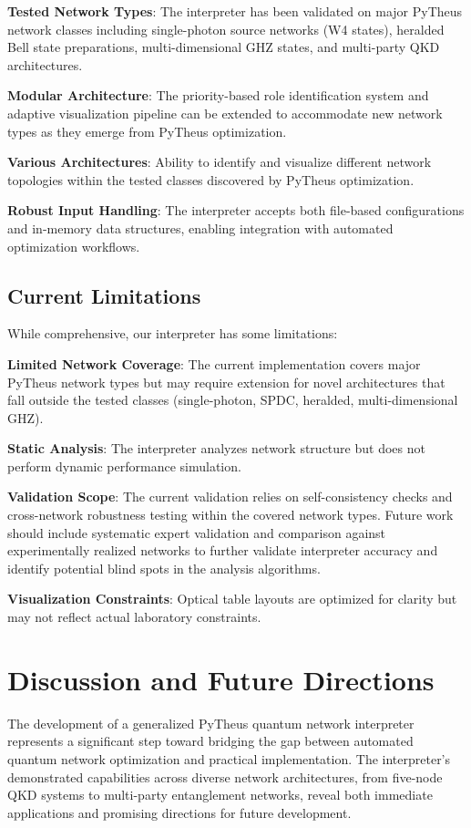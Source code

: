 \documentclass[11pt,a4paper]{article}
\begin{document}
\textbf{Tested Network Types}: The interpreter has been validated on major PyTheus network classes including single-photon source networks (W4 states), heralded Bell state preparations, multi-dimensional GHZ states, and multi-party QKD architectures.

\textbf{Modular Architecture}: The priority-based role identification system and adaptive visualization pipeline can be extended to accommodate new network types as they emerge from PyTheus optimization.

\textbf{Various Architectures}: Ability to identify and visualize different network topologies within the tested classes discovered by PyTheus optimization.

\textbf{Robust Input Handling}: The interpreter accepts both file-based configurations and in-memory data structures, enabling integration with automated optimization workflows.

\subsection{Current Limitations}

While comprehensive, our interpreter has some limitations:

\textbf{Limited Network Coverage}: The current implementation covers major PyTheus network types but may require extension for novel architectures that fall outside the tested classes (single-photon, SPDC, heralded, multi-dimensional GHZ).

\textbf{Static Analysis}: The interpreter analyzes network structure but does not perform dynamic performance simulation.

\textbf{Validation Scope}: The current validation relies on self-consistency checks and cross-network robustness testing within the covered network types. Future work should include systematic expert validation and comparison against experimentally realized networks to further validate interpreter accuracy and identify potential blind spots in the analysis algorithms.

\textbf{Visualization Constraints}: Optical table layouts are optimized for clarity but may not reflect actual laboratory constraints.

\section{Discussion and Future Directions}

The development of a generalized PyTheus quantum network interpreter represents a significant step toward bridging the gap between automated quantum network optimization and practical implementation. The interpreter's demonstrated capabilities across diverse network architectures, from five-node QKD systems to multi-party entanglement networks, reveal both immediate applications and promising directions for future development.
\end{document}
